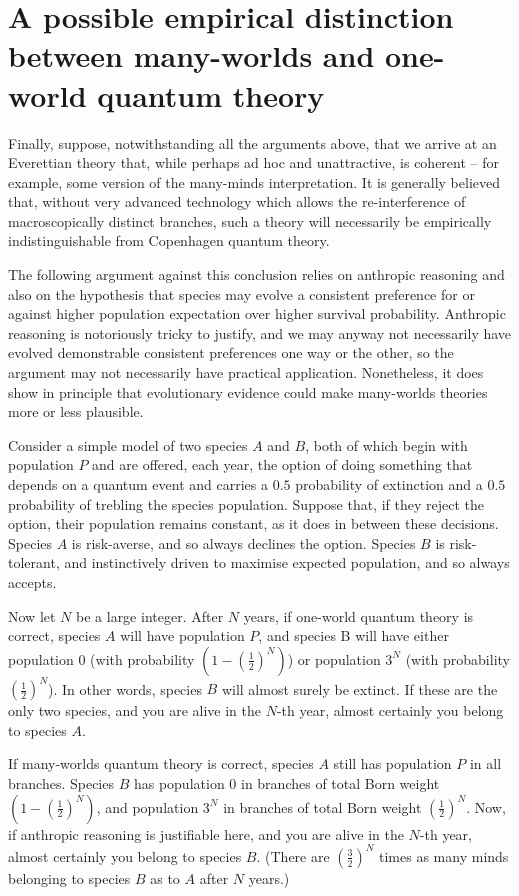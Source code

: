 \documentclass[aps,
pra,epsfig]{revtex4}
\begin{document}
\section{A possible empirical distinction between many-worlds and one-world
quantum theory}

Finally, suppose, notwithstanding all the arguments above, 
that we arrive at an Everettian theory that, while perhaps 
ad hoc and unattractive, is coherent -- for example, some version of 
the many-minds interpretation\cite{almanyminds}.  
It is generally believed that, without very advanced technology which
allows the re-interference of macroscopically distinct branches, 
such a theory will necessarily be empirically indistinguishable from Copenhagen 
quantum theory.  

The following argument against this conclusion relies on anthropic 
reasoning and also on the hypothesis that species may evolve a  
consistent preference for or against higher population expectation over higher 
survival probability.  Anthropic reasoning is notoriously 
tricky to justify, and we may anyway not necessarily have evolved 
demonstrable consistent preferences one way or the other, so 
the argument may not necessarily have practical application.   
Nonetheless, it does
show in principle that evolutionary evidence could make many-worlds 
theories more or less plausible. 

Consider a simple model of two species $A$ and $B$, both of which begin
with population $P$ and are
offered, each year, the option of doing something that depends on a quantum
event and carries a $0.5$ probability of extinction and a $0.5$ probability 
of trebling the species population.  Suppose that, if they reject
the option, their 
population remains constant,
as it does in between these decisions.  Species $A$ is risk-averse, and so
always declines the option.   Species $B$ is risk-tolerant, and 
instinctively driven to maximise expected population, and so always
accepts.  

Now let $N$ be a large integer.  
After $N$ years, if one-world quantum theory is correct, species $A$ 
will have population $P$, and species B will have either population
$0$ (with probability $ ( 1 - ( \frac{1}{2} )^N )$) or population
$3^N$ (with probability $ ( \frac{1}{2} )^N$).   In other words, species
$B$ will almost surely be extinct.   If these are the only two species,
and you are alive in the $N$-th year, almost certainly you belong to 
species $A$.   

If many-worlds quantum theory is correct, species $A$ still has 
population $P$ in all branches.   Species $B$ has population $0$
in branches of total Born weight $ ( 1 - ( \frac{1}{2} )^N )$, and 
population $3^N$ in branches of total Born weight $ ( \frac{1}{2} )^N$. 
Now, if anthropic reasoning is justifiable here, and you are alive in 
the $N$-th year, almost certainly you belong to species $B$.
(There are $( \frac{3}{2} )^N$ times as many minds belonging to species
$B$ as to $A$ after $N$ years.)  
\end{document}
